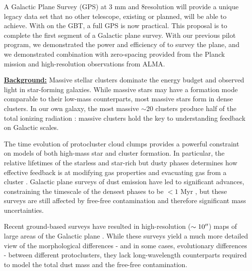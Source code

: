 




A Galactic Plane Survey (GPS) at 3 mm and 8\arcsec resolution will provide a
unique legacy data set that no other telescope, existing or planned, will be
able to achieve.  With \MUSTANG on the GBT, a full GPS is now practical.  This
proposal is to complete the first segment of a Galactic plane survey.  With
our previous pilot program, we demonstrated the power and efficiency of \MUSTANG
to survey the plane, and we demonstrated combination with zero-spacing provided
from the Planck mission and high-resolution observations from ALMA.


\underline{\bf Background:} Massive stellar clusters dominate the energy budget and observed light in star-forming
galaxies.  While massive stars may have a formation mode comparable to their
low-mass counterparts, most massive stars form in dense clusters.  In our own
galaxy, the most massive $\sim$20 clusters produce half of the total ionizing
radiation \citep{Murray2010a}: massive clusters hold the key to
understanding feedback on Galactic scales.  

The time evolution of protocluster cloud clumps provides a powerful constraint
on models of both high-mass star and cluster formation.  In particular, the
relative lifetimes of the starless and star-rich but dusty phases determines
how effective feedback is at modifying gas properties and evacuating gas from a
cluster \citep[e.g.,][]{Ginsburg2016b}.  Galactic plane surveys of dust emission
have led to significant advances, constraining the timescale of the densest
phases to be $<1$ Myr \citep{Svoboda2016a,Ginsburg2012a}, but these
surveys are still affected by free-free contamination and therefore significant
mass uncertainties.

Recent ground-based surveys have resulted in high-resolution ($\sim10\mbox{$^{\prime\prime}$}$)
maps of large areas of the Galactic plane \citep[e.g.,][]{Lin2016a}.  While
these surveys yield a much more detailed view of the morphological differences
- and in some cases, evolutionary differences - between different
protoclusters, they lack long-wavelength counterparts required to model the
total dust mass and the free-free contamination.


